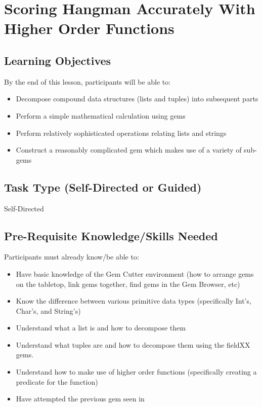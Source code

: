 \section{Scoring Hangman Accurately With Higher Order Functions}

	\subsection*{Learning Objectives}

	By the end of this lesson, participants will be able to:

		\begin{itemize}
			\item Decompose compound data structures (lists and tuples) into subsequent parts
			\item Perform a simple mathematical calculation using gems
			\item Perform relatively sophisticated operations relating lists and strings
			\item Construct a reasonably complicated gem which makes use of a variety of sub-gems
		\end{itemize}

	\subsection*{Task Type (Self-Directed or Guided)}
	Self-Directed

	\subsection*{Pre-Requisite Knowledge/Skills Needed}

	Participants must already know/be able to:

		\begin{itemize}
			\item Have basic knowledge of the Gem Cutter environment (how to arrange gems on the tabletop, link gems together, find gems in the Gem Browser, etc)
			\item Know the difference between various primitive data types (specifically Int's, Char's, and String's)
			\item Understand what a list is and how to decompose them
			\item Understand what tuples are and how to decompose them using the fieldXX gems.
			\item Understand how to make use of higher order functions (specifically creating a predicate for the  function)
			\item Have attempted the previous  gem seen in 
		\end{itemize}

